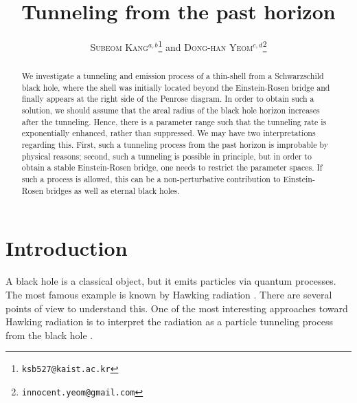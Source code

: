 \documentclass[preprintnumbers,10pt,nofootinbib]{revtex4}
\begin{document}

\title{\textbf{Tunneling from the past horizon}}



\author{
\textsc{Subeom Kang$^{a,b}$}\footnote{{\tt ksb527{}@{}kaist.ac.kr}} and \textsc{Dong-han Yeom$^{c,d}$}\footnote{{\tt innocent.yeom{}@{}gmail.com}}
}


\begin{abstract}
We investigate a tunneling and emission process of a thin-shell from a Schwarzschild black hole, where the shell was initially located beyond the Einstein-Rosen bridge and finally appears at the right side of the Penrose diagram. In order to obtain such a solution, we should assume that the areal radius of the black hole horizon increases after the tunneling. Hence, there is a parameter range such that the tunneling rate is exponentially enhanced, rather than suppressed. We may have two interpretations regarding this. First, such a tunneling process from the past horizon is improbable by physical reasons; second, such a tunneling is possible in principle, but in order to obtain a stable Einstein-Rosen bridge, one needs to restrict the parameter spaces. If such a process is allowed, this can be a non-perturbative contribution to Einstein-Rosen bridges as well as eternal black holes.
\end{abstract}

\maketitle


\newpage

\tableofcontents


\section{Introduction}

A black hole is a classical object, but it emits particles via quantum processes. The most famous example is known by Hawking radiation \cite{Hawking:1974sw}. There are several points of view to understand this. One of the most interesting approaches toward Hawking radiation is to interpret the radiation as a particle tunneling process from the black hole \cite{Hartle:1976tp,Parikh:1999mf,Srinivasan:1998ty}.
\end{document}
